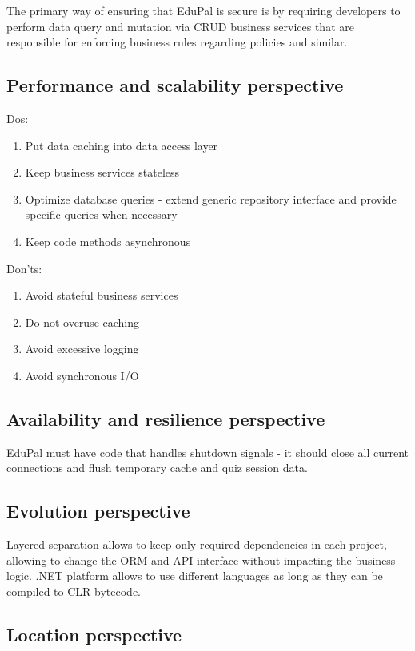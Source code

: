 The primary way of ensuring that EduPal is secure is by requiring developers to perform data query and mutation via CRUD business services that are responsible for enforcing business rules regarding policies and similar.

\subsection{Performance and scalability perspective}

Dos:

\begin{enumerate}
  \item Put data caching into data access layer
  \item Keep business services stateless
  \item Optimize database queries - extend generic repository interface and provide specific queries when necessary
  \item Keep code methods asynchronous
\end{enumerate}

Don'ts:

\begin{enumerate}
  \item Avoid stateful business services
  \item Do not overuse caching
  \item Avoid excessive logging
  \item Avoid synchronous I/O
\end{enumerate}

\subsection{Availability and resilience perspective}

EduPal must have code that handles shutdown signals - it should close all current connections and flush temporary cache and quiz session data.

\subsection{Evolution perspective}

Layered separation allows to keep only required dependencies in each project, allowing to change the ORM and API interface without impacting the business logic. .NET platform allows to use different languages as long as they can be compiled to CLR bytecode.

\subsection{Location perspective}

